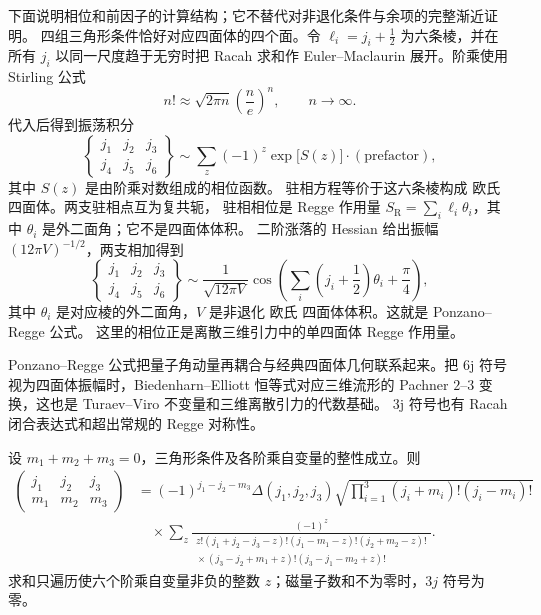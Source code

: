 \begin{note}
下面说明相位和前因子的计算结构；它不替代对非退化条件与余项的完整渐近证明。
四组三角形条件恰好对应四面体的四个面。令
$\ell_i=j_i+\tfrac12$ 为六条棱，并在所有 $j_i$ 以同一尺度趋于无穷时把
Racah 求和作 Euler--Maclaurin 展开。阶乘使用 Stirling 公式
\[
n!\approx\sqrt{2\pi n}\left(\frac{n}{e}\right)^n,\qquad n\to\infty.
\]
代入后得到振荡积分
\[
\begin{Bmatrix}j_1&j_2&j_3\\j_4&j_5&j_6\end{Bmatrix}
\sim\sum_z(-1)^z\exp\bigl[S(z)\bigr]\cdot(\text{prefactor}),
\]
其中 $S(z)$ 是由阶乘对数组成的相位函数。
驻相方程等价于这六条棱构成 欧氏 四面体。两支驻相点互为复共轭，
驻相相位是 Regge 作用量
$S_{\mathrm R}=\sum_i\ell_i\theta_i$，其中 $\theta_i$ 是外二面角；它不是四面体体积。
二阶涨落的 Hessian 给出振幅 $(12\pi V)^{-1/2}$，两支相加得到
\[
\begin{Bmatrix}j_1&j_2&j_3\\j_4&j_5&j_6\end{Bmatrix}
\sim\frac{1}{\sqrt{12\pi V}}
\cos\left(\sum_i\left(j_i+\frac12\right)\theta_i+\frac{\pi}{4}\right),
\]
其中 $\theta_i$ 是对应棱的外二面角，$V$ 是非退化 欧氏 四面体体积。这就是 Ponzano--Regge 公式。
这里的相位正是离散三维引力中的单四面体 Regge 作用量。
\end{note}
\par\medskip
\par\medskip
Ponzano--Regge 公式把量子角动量再耦合与经典四面体几何联系起来。把 6j 符号视为四面体振幅时，Biedenharn--Elliott 恒等式对应三维流形的 Pachner \(2\text{--}3\) 变换，这也是 Turaev--Viro 不变量和三维离散引力的代数基础。
3j 符号也有 Racah 闭合表达式和超出常规的 Regge 对称性。
\begin{theorem}
设 $m_1+m_2+m_3=0$，三角形条件及各阶乘自变量的整性成立。则
\[
\begin{aligned}
\begin{pmatrix}j_1&j_2&j_3\\m_1&m_2&m_3\end{pmatrix}
&=(-1)^{j_1-j_2-m_3}\Delta(j_1,j_2,j_3)
\sqrt{\prod_{i=1}^3(j_i+m_i)!(j_i-m_i)!}\\
&\quad\times\sum_z\frac{(-1)^z}{\begin{gathered}
z!(j_1+j_2-j_3-z)!(j_1-m_1-z)!(j_2+m_2-z)!\\[-2pt]
{}\times(j_3-j_2+m_1+z)!(j_3-j_1-m_2+z)!
\end{gathered}}.
\end{aligned}
\]
求和只遍历使六个阶乘自变量非负的整数 $z$；磁量子数和不为零时，$3j$ 符号为零。
\end{theorem}

